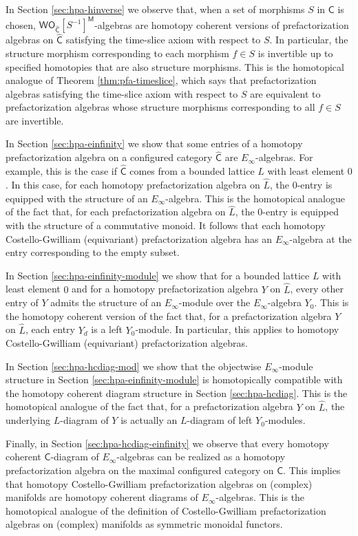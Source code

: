 \documentclass{amsbook}
\numberwithin{section}{chapter}
\numberwithin{subsection}{section}
\numberwithin{equation}{section}
\theoremstyle{plain}
\theoremstyle{definition}
\newcommand{\C}{\mathsf{C}}
\newcommand{\M}{\mathsf{M}}
\renewcommand{\O}{\mathsf{O}}
\newcommand{\W}{\mathsf{W}}
\newcommand{\inv}[1]{{#1}^{-1}}
\newcommand{\Sinv}{\inv{S}}
\newcommand{\Chat}{\widehat{\C}}
\newcommand{\Lhat}{\widehat{L}}
\newcommand{\Ochat}{\O_{\Chat}}
\newcommand{\wochat}{\W\Ochat}
\newcommand{\wochatsinv}{\wochat[\Sinv]}
\newcommand{\wochatsinvm}{\wochatsinv^{\M}}
\begin{document}
In Section \ref{sec:hpa-hinverse} we observe that, when a set of morphisms $S$ in $\C$ is chosen, $\wochatsinvm$-algebras are homotopy coherent versions of prefactorization algebras on $\Chat$ satisfying the time-slice axiom with respect to $S$.  In particular, the structure morphism corresponding to each morphism $f \in S$ is invertible up to specified homotopies that are also structure morphisms.  This is the homotopical analogue of Theorem \ref{thm:pfa-timeslice}, which says that prefactorization algebras satisfying the time-slice axiom with respect to $S$ are equivalent to prefactorization algebras whose structure morphisms corresponding to all $f \in S$ are invertible.

In Section \ref{sec:hpa-einfinity} we show that some entries of a homotopy prefactorization algebra on a configured category $\Chat$ are $E_\infty$-algebras.  For example, this is the case if $\Chat$ comes from a bounded lattice $L$ with least element $0$.  In this case, for each homotopy prefactorization algebra on $\Lhat$, the $0$-entry is equipped with the structure of an $E_\infty$-algebra.  This is the homotopical analogue of the fact that, for each prefactorization algebra on $\Lhat$, the $0$-entry is equipped with the structure of a commutative monoid.  It follows that each homotopy Costello-Gwilliam (equivariant) prefactorization algebra has an $E_\infty$-algebra at the entry corresponding to the empty subset.

In Section \ref{sec:hpa-einfinity-module} we show that for a bounded lattice $L$ with least element $0$ and for a homotopy prefactorization algebra $Y$ on $\Lhat$, every other entry of $Y$ admits the structure of an $E_\infty$-module over the $E_\infty$-algebra $Y_0$.  This is the homotopy coherent version of the fact that, for a prefactorization algebra $Y$ on $\Lhat$, each entry $Y_d$ is a left $Y_0$-module.  In particular, this applies to homotopy Costello-Gwilliam (equivariant) prefactorization algebras.  

In Section \ref{sec:hpa-hcdiag-mod} we show that the objectwise $E_\infty$-module structure in Section \ref{sec:hpa-einfinity-module} is homotopically compatible with the homotopy coherent diagram structure in Section \ref{sec:hpa-hcdiag}.  This is the homotopical analogue of the fact that, for a prefactorization algebra $Y$ on $\Lhat$, the underlying $L$-diagram of $Y$ is actually an $L$-diagram of left $Y_0$-modules.

Finally, in Section \ref{sec:hpa-hcdiag-einfinity} we observe that every homotopy coherent $\C$-diagram of $E_\infty$-algebras can be realized as a homotopy prefactorization algebra on the maximal configured category on $\C$.  This implies that homotopy Costello-Gwilliam prefactorization algebras on (complex) manifolds are homotopy coherent diagrams of $E_\infty$-algebras.  This is the homotopical analogue of the definition of Costello-Gwilliam prefactorization algebras on (complex) manifolds as symmetric monoidal functors.
\end{document}
